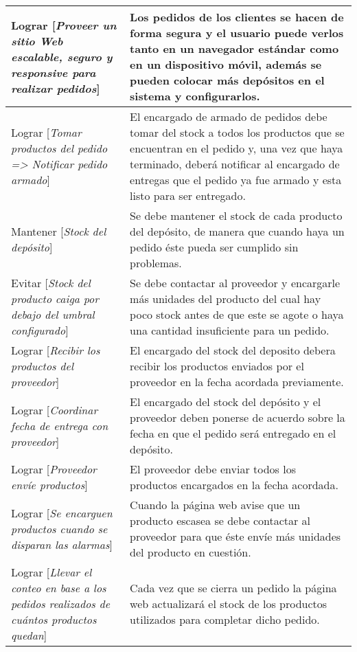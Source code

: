 \begin{center}
\begin{longtable}{p{7cm} p{7cm}}
Lograr [\textit{Proveer un sitio Web escalable, seguro y responsive para realizar pedidos}] & Los pedidos de los clientes se hacen de forma segura y el usuario puede verlos tanto en un navegador estándar como en un dispositivo móvil, además se pueden colocar más depósitos en el sistema y configurarlos. \\[0.2em] \hline

Lograr [\textit{Tomar productos del pedido => Notificar pedido armado}] & El encargado de armado de pedidos debe tomar del stock a todos los productos que se encuentran en el pedido y, una vez que haya terminado, deberá notificar al encargado de entregas que el pedido ya fue armado y esta listo para ser entregado. \\[0.2em] \hline

Mantener [\textit{Stock del depósito}] & Se debe mantener el stock de cada producto del depósito, de manera que cuando haya un pedido éste pueda ser cumplido sin problemas. \\[0.2em] \hline

Evitar [\textit{Stock del producto caiga por debajo del umbral configurado}] & Se debe contactar al proveedor y encargarle más unidades del producto del cual hay poco stock antes de que este se agote o haya una cantidad insuficiente para un pedido. \\[0.2em] \hline

Lograr [\textit{Recibir los productos del proveedor}] & El encargado del stock del deposito debera recibir los productos enviados por el proveedor en la fecha acordada previamente. \\[0.2em] \hline

Lograr [\textit{Coordinar fecha de entrega con proveedor}] & El encargado del stock del depósito y el proveedor deben ponerse de acuerdo sobre la fecha en que el pedido será entregado en el depósito. \\[0.2em] \hline

Lograr [\textit{Proveedor envíe productos}] & El proveedor debe enviar todos los productos encargados en la fecha acordada. \\[0.2em] \hline

Lograr [\textit{Se encarguen productos cuando se disparan las alarmas}] & Cuando la página web avise que un producto escasea se debe contactar al proveedor para que éste envíe más unidades del producto en cuestión. \\[0.2em] \hline

Lograr [\textit{Llevar el conteo en base a los pedidos realizados de cuántos productos quedan}] & Cada vez que se cierra un pedido la página web actualizará el stock de los productos utilizados para completar dicho pedido. \\[0.2em] \hline


\end{longtable}
\end{center}
